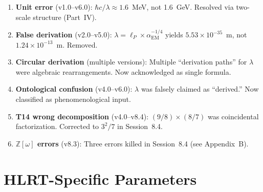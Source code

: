 \documentclass[11pt,letterpaper]{article}
\begin{document}
\begin{enumerate}[label=\textbf{E\arabic*.},nosep]
  \item \textbf{Unit error} (v1.0--v6.0): $\hbar c/\lambda\approx1.6$~MeV,
        not 1.6~GeV.  Resolved via two-scale structure (Part~IV).
  \item \textbf{False derivation} (v2.0--v5.0):
        $\lambda = \ell_P\times\alpha_\mathrm{EM}^{-1/4}$ yields
        $5.53\times10^{-35}$~m, not $1.24\times10^{-13}$~m.  Removed.
  \item \textbf{Circular derivation} (multiple versions):
        Multiple ``derivation paths'' for $\lambda$ were algebraic
        rearrangements.  Now acknowledged as single formula.
  \item \textbf{Ontological confusion} (v4.0--v6.0): $\lambda$ was falsely
        claimed as ``derived.''  Now classified as phenomenological input.
  \item \textbf{T14 wrong decomposition} (v4.0--v8.4):
        $(9/8)\times(8/7)$ was coincidental factorization.  Corrected to
        $3^2/7$ in Session~8.4.
  \item \textbf{$\mathbb{Z}[\omega]$ errors} (v8.3): Three errors killed
        in Session~8.4 (see Appendix~B).
\end{enumerate}

\section{HLRT-Specific Parameters}
\end{document}
